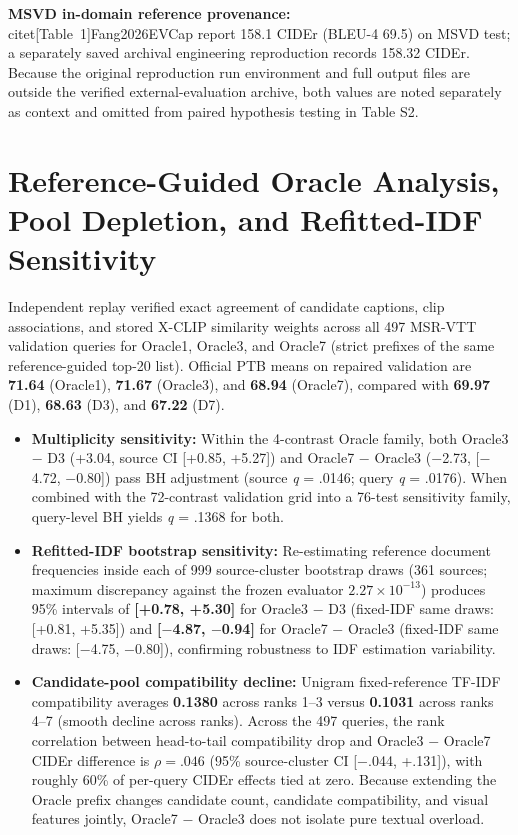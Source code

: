 \documentclass[11pt,a4paper]{article}
\begin{document}
\textbf{MSVD in-domain reference provenance:} \\citet[Table~1]{Fang2026EVCap} report 158.1 CIDEr (BLEU-4 69.5) on MSVD test; a separately saved archival engineering reproduction records 158.32 CIDEr. Because the original reproduction run environment and full output files are outside the verified external-evaluation archive, both values are noted separately as context and omitted from paired hypothesis testing in Table S2.

\section{Reference-Guided Oracle Analysis, Pool Depletion, and Refitted-IDF Sensitivity}
Independent replay verified exact agreement of candidate captions, clip associations, and stored X-CLIP similarity weights across all 497 MSR-VTT validation queries for Oracle1, Oracle3, and Oracle7 (strict prefixes of the same reference-guided top-20 list). Official PTB means on repaired validation are \textbf{71.64} (Oracle1), \textbf{71.67} (Oracle3), and \textbf{68.94} (Oracle7), compared with \textbf{69.97} (D1), \textbf{68.63} (D3), and \textbf{67.22} (D7).

\begin{itemize}
\item \textbf{Multiplicity sensitivity:} Within the 4-contrast Oracle family, both Oracle3 $-$ D3 (+3.04, source CI [+0.85, +5.27]) and Oracle7 $-$ Oracle3 ($-$2.73, [$-$4.72, $-$0.80]) pass BH adjustment (source \emph{q} = .0146; query \emph{q} = .0176). When combined with the 72-contrast validation grid into a 76-test sensitivity family, query-level BH yields \emph{q} = .1368 for both.
\item \textbf{Refitted-IDF bootstrap sensitivity:} Re-estimating reference document frequencies inside each of 999 source-cluster bootstrap draws (361 sources; maximum discrepancy against the frozen evaluator $2.27 \times 10^{-13}$) produces 95\% intervals of \textbf{[+0.78, +5.30]} for Oracle3 $-$ D3 (fixed-IDF same draws: [+0.81, +5.35]) and \textbf{[$-$4.87, $-$0.94]} for Oracle7 $-$ Oracle3 (fixed-IDF same draws: [$-$4.75, $-$0.80]), confirming robustness to IDF estimation variability.
\item \textbf{Candidate-pool compatibility decline:} Unigram fixed-reference TF-IDF compatibility averages \textbf{0.1380} across ranks 1--3 versus \textbf{0.1031} across ranks 4--7 (smooth decline across ranks). Across the 497 queries, the rank correlation between head-to-tail compatibility drop and Oracle3 $-$ Oracle7 CIDEr difference is \textbf{$\rho = .046$} (95\% source-cluster CI [$-$.044, +.131]), with roughly 60\% of per-query CIDEr effects tied at zero. Because extending the Oracle prefix changes candidate count, candidate compatibility, and visual features jointly, Oracle7 $-$ Oracle3 does not isolate pure textual overload.
\end{itemize}
\end{document}
